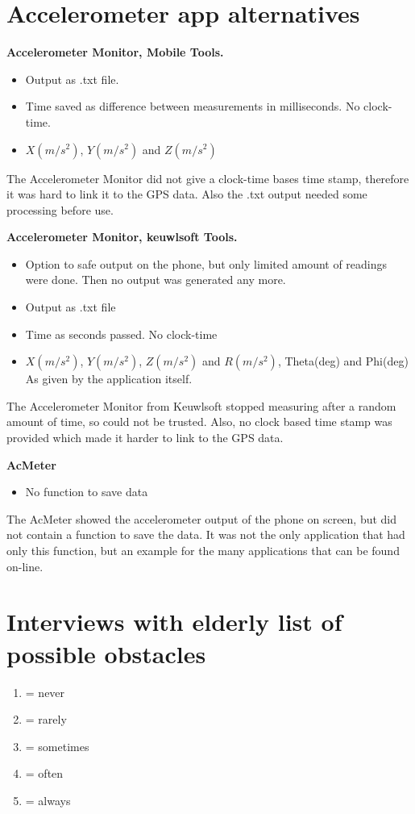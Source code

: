 \begin{appendix}
\section{Accelerometer app alternatives}\label{Aapps}
\textbf{Accelerometer Monitor, Mobile Tools.}
\begin{itemize}
\item Output as .txt file. 
\item Time saved as difference between measurements in milliseconds. No clock-time.
\item $X(m/s^2)$, $Y(m/s^2)$ and $Z(m/s^2)$
\end{itemize}
The Accelerometer Monitor did not give a clock-time bases time stamp, therefore it was hard to link it to the GPS data. Also the .txt output needed some processing before use. 

\textbf{Accelerometer Monitor, keuwlsoft Tools.}
\begin{itemize}
\item Option to safe output on the phone, but only limited amount of readings were done. Then no output was generated any more.
\item Output as .txt file
\item Time as seconds passed. No clock-time
\item $X(m/s^2)$, $Y(m/s^2)$, $Z(m/s^2)$ and $R(m/s^2)$, Theta(deg) and Phi(deg) As given by the application itself. 
\end{itemize}
The Accelerometer Monitor from Keuwlsoft stopped measuring after a random amount of time, so could not be trusted. Also, no clock based time stamp was provided which made it harder to link to the GPS data.

\textbf{AcMeter}
\begin{itemize}
\item No function to save data
\end{itemize}
The AcMeter showed the accelerometer output of the phone on screen, but did not contain a function to save the data. It was not the only application that had only this function, but an example for the many applications that can be found on-line. 

\clearpage

\section{Interviews with elderly list of possible obstacles}\label{Aelderly}
\begin{enumerate}
	\item = never
	\item = rarely
	\item = sometimes
	\item = often
	\item = always
\end{enumerate}


\end{appendix}
